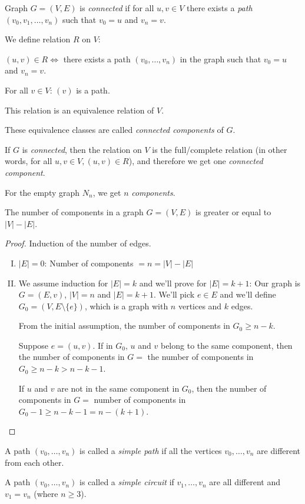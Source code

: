 \documentclass[00_complete]{subfiles}
\begin{document}
\begin{definition}[Connectivity]
    Graph $G=(V,E)$ is \emph{connected} if for all $u,v \in V$ there exists a
    \emph{path} $(v_0,v_1,\dots,v_n)$ such that $v_0=u$ and $v_n=v$.
\end{definition}
\begin{definition}[Components]
    We define relation $R$ on $V$:

    $(u,v) \in R \iff$ there exists a path $(v_0,\dots,v_n)$ in the graph such
    that $v_0=u$ and $v_n=v$.
    \begin{note}
    For all $v \in V$: $(v)$ is a path.
\end{note}
\begin{claim}
    This relation is an equivalence relation of $V$.
\end{claim}
\end{definition}
These equivalence classes are called \emph{connected components} of $G$.
\begin{claim}
    If $G$ is \emph{connected}, then the relation on $V$ is the full/complete
    relation (in other words, for all $u,v \in V, (u,v) \in R$), and therefore
    we get one \emph{connected component}.

    For the empty graph $N_n$, we get $n$ \emph{components}.
\end{claim}
\begin{claim}
    The number of components in a graph $G=(V,E)$ is greater or equal to
    $|V|-|E|$.
\end{claim}
\begin{proof}
    Induction of the number of edges.
    \begin{enumerate}[I.]
        \item $|E|=0$: Number of components $=n=|V|-|E|$
        \item We assume induction for $|E|=k$ and we'll prove for $|E|=k+1$:
        Our graph is $G=(E,v)$, $|V|=n$ and $|E|=k+1$. We'll pick $e \in E$ and
        we'll define $G_0=(V,E\setminus\{e\})$, which is a graph with $n$
        vertices and $k$ edges.

        From the initial assumption, the number of components in $G_0 \geq
        n-k$.

        Suppose $e=(u,v)$. If in $G_0$, $u$ and $v$ belong to the same
        component, then the number of components in $G =$ the number of
        components in $G_0 \geq n-k > n-k-1$.

        If $u$ and $v$ are not in the same component in $G_0$, then the number
        of components in $G =$ number of components in $G_0-1 \geq n-k-1 =
        n-(k+1)$.
    \end{enumerate}
\end{proof}
\begin{definition}
     A path $(v_0,\dots,v_n)$ is called a \emph{simple path} if all the
     vertices $v_0,\dots,v_n$ are different from each other.
\end{definition}
\begin{definition}
    A path $(v_0,\dots,v_n)$ is called a \emph{simple circuit} if
    $v_1,\dots,v_n$ are all different and $v_1=v_n$ (where $n\geq3$).
\end{definition}
\end{document}
